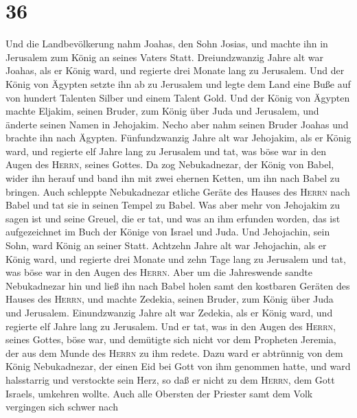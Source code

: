 \hypertarget{section-35}{%
\section{36}\label{section-35}}

 Und die Landbevölkerung nahm Joahas, den Sohn Josias, und
machte ihn in Jerusalem zum König an seines Vaters Statt. 
Dreiundzwanzig Jahre alt war Joahas, als er König ward, und regierte
drei Monate lang zu Jerusalem.  Und der König von Ägypten
setzte ihn ab zu Jerusalem und legte dem Land eine Buße auf von hundert
Talenten Silber und einem Talent Gold.  Und der König von
Ägypten machte Eljakim, seinen Bruder, zum König über Juda und
Jerusalem, und änderte seinen Namen in Jehojakim. Necho aber nahm seinen
Bruder Joahas und brachte ihn nach Ägypten. 
Fünfundzwanzig Jahre alt war Jehojakim, als er König ward, und regierte
elf Jahre lang zu Jerusalem und tat, was böse war in den Augen des
\textsc{Herrn}, seines Gottes.  Da zog Nebukadnezar, der
König von Babel, wider ihn herauf und band ihn mit zwei ehernen Ketten,
um ihn nach Babel zu bringen.  Auch schleppte Nebukadnezar
etliche Geräte des Hauses des \textsc{Herrn} nach Babel und tat sie in
seinen Tempel zu Babel.  Was aber mehr von Jehojakim zu
sagen ist und seine Greuel, die er tat, und was an ihm erfunden worden,
das ist aufgezeichnet im Buch der Könige von Israel und Juda. Und
Jehojachin, sein Sohn, ward König an seiner Statt. 
Achtzehn Jahre alt war Jehojachin, als er König ward, und regierte drei
Monate und zehn Tage lang zu Jerusalem und tat, was böse war in den
Augen des \textsc{Herrn}.  Aber um die Jahreswende sandte
Nebukadnezar hin und ließ ihn nach Babel holen samt den kostbaren
Geräten des Hauses des \textsc{Herrn}, und machte Zedekia, seinen
Bruder, zum König über Juda und Jerusalem.  Einundzwanzig
Jahre alt war Zedekia, als er König ward, und regierte elf Jahre lang zu
Jerusalem.  Und er tat, was in den Augen des
\textsc{Herrn}, seines Gottes, böse war, und demütigte sich nicht vor
dem Propheten Jeremia, der aus dem Munde des \textsc{Herrn} zu ihm
redete.  Dazu ward er abtrünnig von dem König
Nebukadnezar, der einen Eid bei Gott von ihm genommen hatte, und ward
halsstarrig und verstockte sein Herz, so daß er nicht zu dem
\textsc{Herrn}, dem Gott Israels, umkehren wollte.  Auch
alle Obersten der Priester samt dem Volk vergingen sich schwer nach
